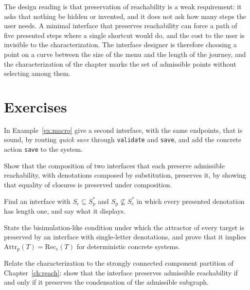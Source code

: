 The design reading is that preservation of reachability is a weak requirement: it asks that nothing be hidden or invented, and it does not ask how many steps the user needs. A minimal interface that preserves reachability can force a path of five presented steps where a single shortcut would do, and the cost to the user is invisible to the characterization. The interface designer is therefore choosing a point on a curve between the size of the menu and the length of the journey, and the characterization of the chapter marks the set of admissible points without selecting among them.

\section*{Exercises}

\begin{exercise}
In Example~\ref{ex:macro} give a second interface, with the same endpoints, that is sound, by routing \textit{quick save} through \texttt{validate} and \texttt{save}, and add the concrete action \texttt{save} to the system.
\end{exercise}

\begin{exercise}
Show that the composition of two interfaces that each preserve admissible reachability, with denotations composed by substitution, preserves it, by showing that equality of closures is preserved under composition.
\end{exercise}

\begin{exercise}
Find an interface with $S_{\mathrm c}\subseteq S_{\mathrm p}^{*}$ and $S_{\mathrm p}\not\subseteq S_{\mathrm c}^{*}$ in which every presented denotation has length one, and say what it displays.
\end{exercise}

\begin{exercise}
State the bisimulation-like condition under which the attractor of every target is preserved by an interface with single-letter denotations, and prove that it implies $\mathrm{Attr}_{\mathrm p}(T)=\mathrm{Rec}_{\mathrm c}(T)$ for deterministic concrete systems.
\end{exercise}

\begin{exercise}
Relate the characterization to the strongly connected component partition of Chapter~\ref{ch:reach}: show that the interface preserves admissible reachability if and only if it preserves the condensation of the admissible subgraph.
\end{exercise}

